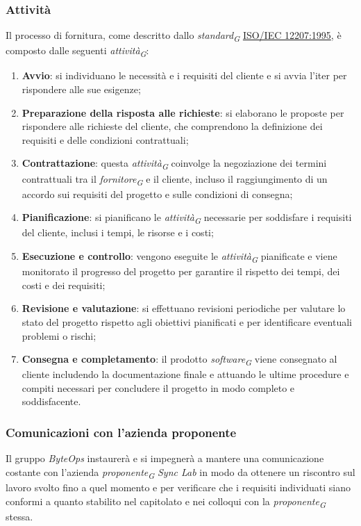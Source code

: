 \subsubsection{Attività}
Il processo di fornitura, come descritto dallo \textit{standard}\textsubscript{\textit{G}} \href{https://www.math.unipd.it/~tullio/IS-1/2009/Approfondimenti/ISO_12207-1995.pdf}{ISO/IEC 12207:1995}, è composto dalle seguenti \textit{attività}\textsubscript{\textit{G}}:
\begin{enumerate}
    \item \textbf{Avvio}: si individuano le necessità e i requisiti del cliente e si avvia l'iter per rispondere alle sue esigenze;
    \item \textbf{Preparazione della risposta alle richieste}: si elaborano le proposte per rispondere alle richieste del cliente, che comprendono la definizione dei requisiti e delle condizioni contrattuali;
    \item \textbf{Contrattazione}: questa \textit{attività}\textsubscript{\textit{G}} coinvolge la negoziazione dei termini contrattuali tra il \textit{fornitore}\textsubscript{\textit{G}} e il cliente, incluso il raggiungimento di un accordo sui requisiti del progetto e sulle condizioni di consegna;
    \item \textbf{Pianificazione}: si pianificano le \textit{attività}\textsubscript{\textit{G}} necessarie per soddisfare i requisiti del cliente, inclusi i tempi, le risorse e i costi;
    \item \textbf{Esecuzione e controllo}: vengono eseguite le \textit{attività}\textsubscript{\textit{G}} pianificate e viene monitorato il progresso del progetto per garantire il rispetto dei tempi, dei costi e dei requisiti;
    \item \textbf{Revisione e valutazione}:  si effettuano revisioni periodiche per valutare lo stato del progetto rispetto agli obiettivi pianificati e per identificare eventuali problemi o rischi;
    \item \textbf{Consegna e completamento}: il prodotto \textit{software}\textsubscript{\textit{G}} viene consegnato al cliente includendo la documentazione finale e attuando le ultime procedure e compiti necessari per concludere il progetto in modo completo e soddisfacente.
\end{enumerate}

\vspace{0.1cm}

\subsubsection{Comunicazioni con l'azienda proponente}
Il gruppo \textit{ByteOps} instaurerà e si impegnerà a mantere una comunicazione costante con l'azienda \textit{proponente}\textsubscript{\textit{G}} \textit{Sync Lab} in modo da ottenere un riscontro sul lavoro svolto fino a quel momento e per verificare che i requisiti individuati siano conformi a quanto stabilito nel capitolato e nei colloqui con la \textit{proponente}\textsubscript{\textit{G}} stessa.

